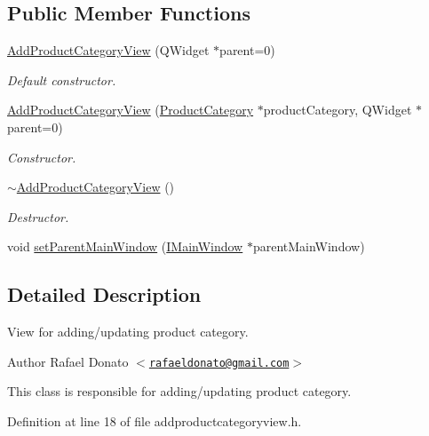 \subsection*{\-Public \-Member \-Functions}
\begin{DoxyCompactItemize}
\item 
\hyperlink{class_add_product_category_view_a15865c59531daa04aecfc02a31679b63}{\-Add\-Product\-Category\-View} (\-Q\-Widget $\ast$parent=0)
\begin{DoxyCompactList}\small\item\em \-Default constructor. \end{DoxyCompactList}\item 
\hyperlink{class_add_product_category_view_a4a4ccc570428026eda8105e1c3f3bbc5}{\-Add\-Product\-Category\-View} (\hyperlink{class_product_category}{\-Product\-Category} $\ast$product\-Category, \-Q\-Widget $\ast$parent=0)
\begin{DoxyCompactList}\small\item\em \-Constructor. \end{DoxyCompactList}\item 
\hyperlink{class_add_product_category_view_a5f15c2648b1ec3a1adb36fd8f9d0cd1a}{$\sim$\-Add\-Product\-Category\-View} ()
\begin{DoxyCompactList}\small\item\em \-Destructor. \end{DoxyCompactList}\item 
void \hyperlink{class_add_product_category_view_a5fc4e0395727bff40dce51db1cb56797}{set\-Parent\-Main\-Window} (\hyperlink{class_i_main_window}{\-I\-Main\-Window} $\ast$parent\-Main\-Window)
\end{DoxyCompactItemize}


\subsection{\-Detailed \-Description}
\-View for adding/updating product category. 

\begin{DoxyAuthor}{\-Author}
\-Rafael \-Donato $<$\href{mailto:rafaeldonato@gmail.com}{\tt rafaeldonato@gmail.\-com}$>$
\end{DoxyAuthor}
\-This class is responsible for adding/updating product category. 

\-Definition at line 18 of file addproductcategoryview.\-h.



